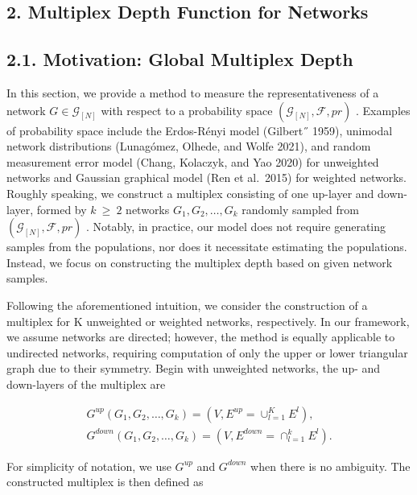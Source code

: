 \documentclass[
  10
]{article}
\begin{document}
\subsection{2. Multiplex Depth Function for
Networks}\label{multiplex-depth-function-for-networks}

\subsection{2.1. Motivation: Global Multiplex
Depth}\label{motivation-global-multiplex-depth}

In this section, we provide a method to measure the representativeness
of a network \(G \in { \mathcal { G } } _ { [ N ] }\) with respect to a
probability space
\(( \mathcal { G } _ { [ N ] } , \mathcal { F } , p r )\) . Examples of
probability space include the Erdos-Rényi model (Gilbert˝ 1959),
unimodal network distributions (Lunagómez, Olhede, and Wolfe 2021), and
random measurement error model (Chang, Kolaczyk, and Yao 2020) for
unweighted networks and Gaussian graphical model (Ren et al.~2015) for
weighted networks. Roughly speaking, we construct a multiplex consisting
of one up-layer and down-layer, formed by \(k \ \geq \ 2\) networks
\(G _ { 1 } , G _ { 2 } , \ldots , G _ { k }\) randomly sampled from
\(( \mathcal { G } _ { [ N ] } , \mathcal { F } , p r )\) . Notably, in
practice, our model does not require generating samples from the
populations, nor does it necessitate estimating the populations.
Instead, we focus on constructing the multiplex depth based on given
network samples.

Following the aforementioned intuition, we consider the construction of
a multiplex for K unweighted or weighted networks, respectively. In our
framework, we assume networks are directed; however, the method is
equally applicable to undirected networks, requiring computation of only
the upper or lower triangular graph due to their symmetry. Begin with
unweighted networks, the up- and down-layers of the multiplex are

\[
\begin{array}{c} {G ^ {u p} (G _ {1}, G _ {2}, \ldots , G _ {k}) = (V, E ^ {u p} = \cup_ {l = 1} ^ {K} E ^ {l}),} \\ {G ^ {d o w n} (G _ {1}, G _ {2}, \ldots , G _ {k}) = (V, E ^ {d o w n} = \cap_ {l = 1} ^ {k} E ^ {l}).} \end{array}
\]

For simplicity of notation, we use \(G ^ { u p }\) and
\(G ^ { d o w n }\) when there is no ambiguity. The constructed
multiplex is then defined as
\end{document}
